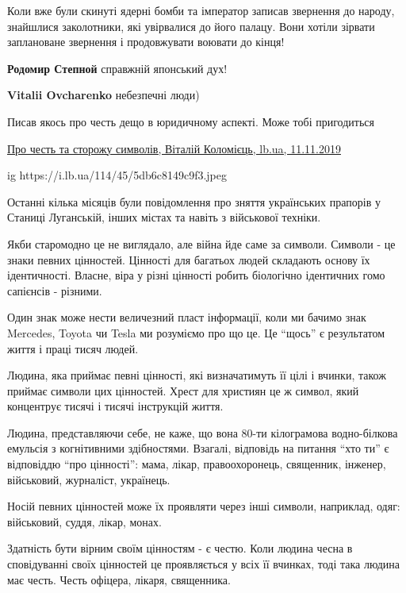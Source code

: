 \begin{itemize}
Коли вже були скинуті ядерні бомби та імператор записав звернення до народу,
знайшлися заколотники, які увірвалися до його палацу. Вони хотіли зірвати
заплановане звернення і продовжувати воювати до кінця!

\begin{itemize} %
\textbf{Родомир Степной} справжній японський дух!

\textbf{Vitalii Ovcharenko} небезпечні люди)
\end{itemize} %

Писав якось про честь дещо в юридичному аспекті. Може тобі пригодиться

\href{https://lb.ua/blog/vitalii_kolomiets/441901_pro_chest_storozhu_simvoliv.html}{%
Про честь та сторожу символів, Віталій Коломієць, lb.ua, 11.11.2019%
}

\raggedcolumns
\begin{multicols}{2} %
\setlength{\parindent}{0pt}

\ifcmt
  ig https://i.lb.ua/114/45/5db6c8149c9f3.jpeg
\fi

Останні кілька місяців були повідомлення про зняття українських прапорів у
Станиці Луганській, інших містах та навіть з військової техніки.

Якби старомодно це не виглядало, але війна йде саме за символи. Символи - це
знаки певних цінностей. Цінності для багатьох людей складають основу їх
ідентичності. Власне, віра у різні цінності робить біологічно ідентичних гомо
сапієнсів - різними.

Один знак може нести величезний пласт інформації, коли ми бачимо знак Mercedes,
Toyota чи Tesla ми розуміємо про що це. Це \enquote{щось} є результатом життя і праці
тисяч людей.

Людина, яка приймає певні цінності, які визначатимуть її цілі і вчинки, також
приймає символи цих цінностей. Хрест для християн це ж символ, який концентрує
тисячі і тисячі інструкцій життя.

Людина, представляючи себе, не каже, що вона 80-ти кілограмова водно-білкова
емульсія з когнітивними здібностями. Взагалі, відповідь на питання \enquote{хто ти} є
відповіддю \enquote{про цінності}: мама, лікар, правоохоронець, священник, інженер,
військовий, журналіст, українець.

Носій певних цінностей може їх проявляти через інші символи, наприклад, одяг: військовий, суддя, лікар, монах.

Здатність бути вірним своїм цінностям - є честю. Коли людина чесна в
сповідуванні своїх цінностей це проявляється у всіх її вчинках, тоді така
людина має честь. Честь офіцера, лікаря, священника.


\end{multicols}
\end{itemize}
